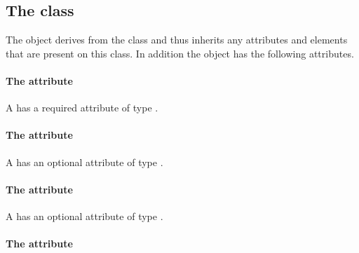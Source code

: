 \subsection{The  class}
\label{csgrotation-class}




The \CSGRotation object derives from the \CSGTransformation class and
thus inherits any attributes and elements that are present on this
class.
In addition the \CSGRotation object has the following attributes.

\paragraph{The \fixttspace{} attribute}

A \CSGRotation has a required attribute  of type
.


\paragraph{The \fixttspace{} attribute}

A \CSGRotation has an optional attribute  of type
.


\paragraph{The \fixttspace{} attribute}

A \CSGRotation has an optional attribute  of type
.


\paragraph{The \fixttspace{} attribute}

